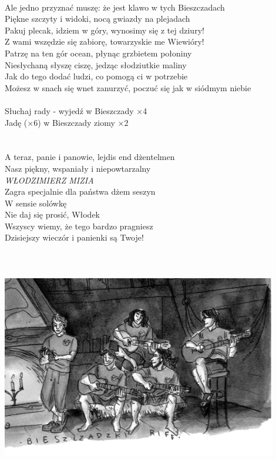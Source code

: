 \documentclass[a5paper, 10pt]{book}
\begin{document}
\newpage
\begin{minipage}[t]{1\textwidth}
~\\
Ale jedno przyznać muszę: że jest klawo w tych Bieszczadach\\
Piękne szczyty i widoki, nocą gwiazdy na plejadach\\
Pakuj plecak, idziem w góry, wynosimy się z tej dziury!\\
Z wami wszędzie się zabiorę, towarzyskie me Wiewióry!\\
\hspace*{3mm}Patrzę na ten gór ocean, płynąc grzbietem połoniny\\
\hspace*{3mm}Niesłychaną słyszę ciszę, jedząc słodziutkie maliny\\
\hspace*{3mm}Jak do tego dodać ludzi, co pomogą ci w potrzebie\\
\hspace*{3mm}Możesz w snach się wnet zanurzyć, poczuć się jak w siódmym niebie\\
\\
\hspace*{10mm}Słuchaj rady - wyjedź w Bieszczady $\times$4\\
\hspace*{10mm}Jadę ($\times$6) w Bieszczady ziomy $\times$2\\
\\
\\
A teraz, panie i panowie, lejdis end dżentelmen\\
Nasz piękny, wspaniały i niepowtarzalny\\
\hspace*{4mm}\textit{\large WŁODZIMIERZ MIZIA}\\
Zagra specjalnie dla państwa dżem seszyn\\
W sensie solówkę\\
Nie daj się prosić, Włodek\\
Wszyscy wiemy, że tego bardzo pragniesz\\
Dzisiejszy wieczór i panienki są Twoje!\\
\\
\\
\\
\includegraphics[width=12cm]{images/bieszczadzki_riff.png}
\end{minipage}
\end{document}
